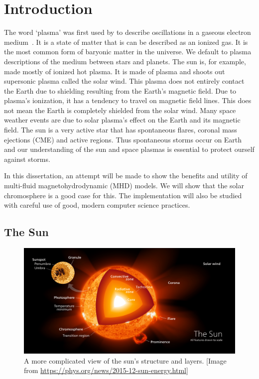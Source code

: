 \documentclass[12pt,upcase]{umlthesis}
\begin{document}
\tableofcontents
\listoffigures
\listoftables

\chapter{Introduction}

The word `plasma' was first used by \citet{Langmuir1928} to describe oscillations in a gaseous electron medium~\citep{Tonks1967}. It is a state of matter that is can be described as an ionized gas. It is the most common form of baryonic matter in the universe. We default to plasma descriptions of the medium between stars and planets. The sun is, for example, made mostly of ionized hot plasma. It is made of plasma and shoots out supersonic plasma called the solar wind. This plasma does not entirely contact the Earth due to shielding resulting from the Earth's magnetic field. Due to plasma's ionization, it has a tendency to travel on magnetic field lines. This does not mean the Earth is completely shielded from the solar wind. Many space weather events are due to solar plasma's effect on the Earth and its magnetic field. The sun is a very active star that has spontaneous flares, coronal mass ejections (CME) and active regions. Thus spontaneous storms occur on Earth and our understanding of the sun and space plasmas is essential to protect ourself against storms.

In this dissertation, an attempt will be made to show the benefits and utility of multi-fluid magnetohydrodynamic (MHD) models. We will show that the solar chromosphere is a good case for this. The implementation will also be studied with careful use of good, modern computer science practices.

\section{The Sun}

\begin{figure}[h!]\label{fig:sunstructure}
	\centering
	\includegraphics[width=1.0\linewidth]{images/sunstructure.png}
	\caption{A more complicated view of the sun's structure and layers. [{Image from \url{https://phys.org/news/2015-12-sun-energy.html}}]} %
\end{figure}
\end{document}
